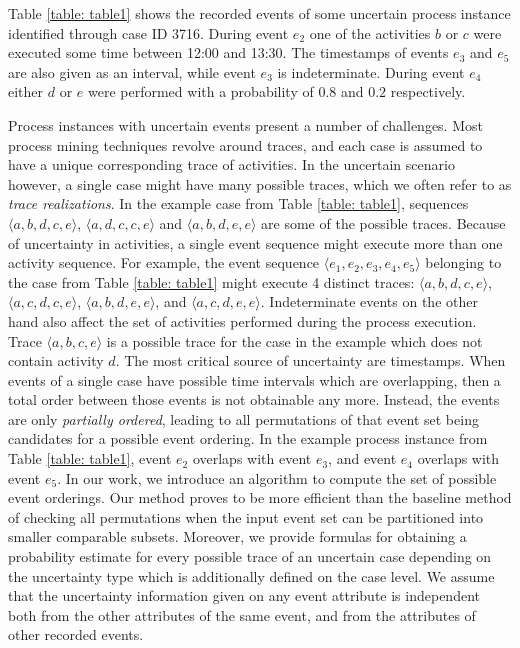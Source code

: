 Table \ref{table: table1} shows the recorded events of some uncertain process instance identified through case ID 3716.
During event $e_2$ one of the activities $b$ or $c$ were executed some time between 12:00 and 13:30.
The timestamps of events $e_3$ and $e_5$ are also given as an interval, while event $e_3$ is indeterminate.
During event $e_4$ either $d$ or $e$ were performed with a probability of $0.8$ and $0.2$ respectively.

Process instances with uncertain events present a number of challenges.
Most process mining techniques revolve around traces, and each case is assumed to have a unique corresponding trace of activities.
In the uncertain scenario however, a single case might have many possible traces, which we often refer to as \textit{trace realizations}.
In the example case from Table \ref{table: table1}, sequences $\langle a,b,d,c,e\rangle$, $\langle a,d,c,c,e\rangle$ and $\langle a,b,d,e,e\rangle$ are some of the possible traces.
Because of uncertainty in activities, a single event sequence might execute more than one activity sequence.
For example, the event sequence $\langle e_1,e_2,e_3,e_4,e_5 \rangle$ belonging to the case from Table \ref{table: table1} might execute 4 distinct traces: $\langle a,b,d,c,e \rangle$, $\langle a,c,d,c,e \rangle$, $\langle a,b,d,e,e \rangle$, and $\langle a,c,d,e,e\rangle$.
Indeterminate events on the other hand also affect the set of activities performed during the process execution.
Trace $\langle a,b,c,e \rangle$ is a possible trace for the case in the example which does not contain activity $d$.
The most critical source of uncertainty are timestamps.
When events of a single case have possible time intervals which are overlapping, then a total order between those events is not obtainable any more.
Instead, the events are only \textit{partially ordered}, leading to all permutations of that event set being candidates for a possible event ordering.
In the example process instance from Table \ref{table: table1}, event $e_2$ overlaps with event $e_3$, and event $e_4$ overlaps with event $e_5$.
In our work, we introduce an algorithm to compute the set of possible event orderings.
Our method proves to be more efficient than the baseline method of checking all permutations when the input event set can be partitioned into smaller comparable subsets.
Moreover, we provide formulas for obtaining a probability estimate for every possible trace of an uncertain case depending on the uncertainty type which is additionally defined on the case level.
We assume that the uncertainty information given on any event attribute is independent both from the other attributes of the same event, and from the attributes of other recorded events.
